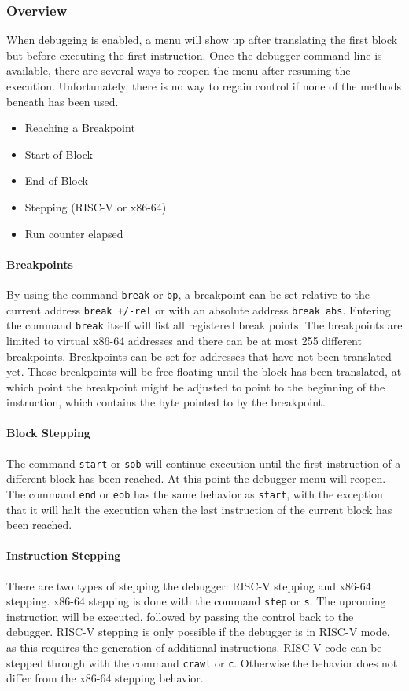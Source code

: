 	\subsubsection{Overview}
		When debugging is enabled, a menu will show up after translating the first block but before executing the first instruction. Once the debugger command line is available, there are several ways to reopen the menu after resuming the execution. Unfortunately, there is no way to regain control if none of the methods beneath has been used.
		\begin{itemize}
			\item Reaching a Breakpoint
			\item Start of Block
			\item End of Block
			\item Stepping (RISC-V or x86-64)
			\item Run counter elapsed
		\end{itemize}
	
	\paragraph{Breakpoints}
		By using the command \texttt{break} or \texttt{bp}, a breakpoint can be set relative to the current address \texttt{break +/-rel} or with an absolute address \texttt{break abs}. Entering the command \texttt{break} itself will list all registered break points. The breakpoints are limited to virtual x86-64 addresses and there can be at most 255 different breakpoints. Breakpoints can be set for addresses that have not been translated yet. Those breakpoints will be free floating until the block has been translated, at which point the breakpoint might be adjusted to point to the beginning of the instruction, which contains the byte pointed to by the breakpoint.
		
	\paragraph{Block Stepping}
		The command \texttt{start} or \texttt{sob} will continue execution until the first instruction of a different block has been reached. At this point the debugger menu will reopen. The command \texttt{end} or \texttt{eob} has the same behavior as \texttt{start}, with the exception that it will halt the execution when the last instruction of the current block has been reached.
		
	\paragraph{Instruction Stepping}
		There are two types of stepping the debugger: RISC-V stepping and x86-64 stepping. x86-64 stepping is done with the command \texttt{step} or \texttt{s}. The upcoming instruction will be executed, followed by passing the control back to the debugger. RISC-V stepping is only possible if the debugger is in RISC-V mode, as this requires the generation of additional instructions. RISC-V code can be stepped through with the command \texttt{crawl} or \texttt{c}. Otherwise the behavior does not differ from the x86-64 stepping behavior.
		

